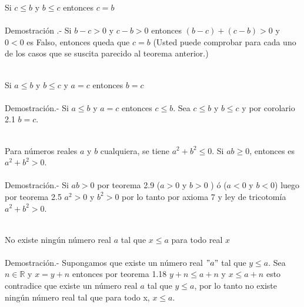 \begin{col.}
Si $c\leq b$ y $b \leq c$ entonces $c=b$\\\\
Demostración .- \; Si $b-c>0$ y $c-b>0$ entonces $(b-c)+(c-b)>0$ y $0<0$ es Falso, entonces queda que $c=b$ (Usted puede comprobar para cada uno de los casos que se suscita parecido al teorema anterior.)\\\\
\end{col.}

\begin{teo}
Si $a\leq b$ y $b \leq c$ y $a=c$ entonces $b=c$\\\\
Demostración.- \; Si $a\leq b$\;  y \; $a=c$ entonces $c\leq b$. Sea $c\leq b$ \; y \; $b\leq c$ y por corolario 2.1 \; $b=c$.\\\\
\end{teo}

\begin{teo}
Para números reales $a$ y $b$ cualquiera, se tiene $a^2+b^2\leq 0$. Si $ab\geq 0$, entonces es $a^2+b^2>0$.\\\\
Demostración.- \; Si $ab>0$ por teorema 2.9 ($a>0$ y $b>0$ ) ó ($a<0$ y $b<0$) luego por teorema 2.5 $a^2>0$ y $b^2>0$ por lo tanto por axioma 7 y ley de tricotomía $a^2+b^2>0$.\\\\ 
\end{teo}

\begin{teo}
No existe ningún número real $a$ tal que $x\leq a$ para todo real $x$\\\\
Demostración.- \; Supongamos que existe un número real $" a "$ tal que $y \leq a$. Sea $n\in \mathbb{R}$ \; y \; $x=y+n$ entonces por teorema 1.18 \; $y+n \leq a+n$ \; y \; $x\leq a+n$ esto contradice que existe un número real $a$ tal que $y\leq a$, por lo tanto no existe ningún número real tal que para todo x, $x\leq a$.\\\\
\end{teo}

